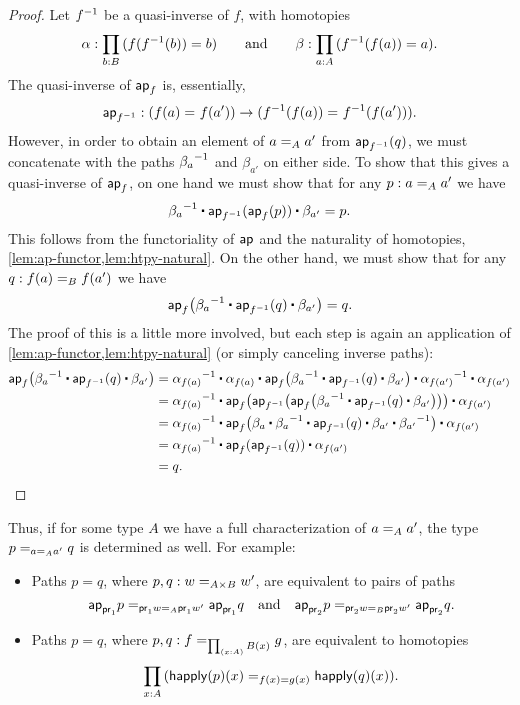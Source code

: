 \begin{proof}
  Let $\opp f$ be a quasi-inverse of $f$, with homotopies
  \begin{equation*}
    \alpha:\prd{b:B} (f(\opp f(b))=b)
    \qquad\text{and}\qquad
    \beta:\prd{a:A} (\opp f(f(a)) = a).
  \end{equation*}
  The quasi-inverse of $\apfunc{f}$ is, essentially,
  \[\apfunc{\opp f} : (\id{f(a)}{f(a')}) \to (\id{\opp f(f(a))}{\opp f(f(a'))}).\]
  However, in order to obtain an element of $\id[A]{a}{a'}$ from $\apfunc{\opp f}(q)$, we must concatenate with the paths $\opp{\beta_a}$ and $\beta_{a'}$ on either side.
  To show that this gives a quasi-inverse of $\apfunc{f}$, on one hand we must show that for any $p:\id[A]{a}{a'}$ we have
  \[ \opp{\beta_a} \ct \apfunc{\opp f}(\apfunc{f}(p)) \ct \beta_{a'} = p. \]
  This follows from the functoriality of $\apfunc{}$ and the naturality of homotopies, \autoref{lem:ap-functor,lem:htpy-natural}.
  On the other hand, we must show that for any $q:\id[B]{f(a)}{f(a')}$ we have
  \[ \apfunc{f}\big( \opp{\beta_a} \ct \apfunc{\opp f}(q) \ct \beta_{a'} \big) = q. \]
  The proof of this is a little more involved, but each step is again an application of \autoref{lem:ap-functor,lem:htpy-natural} (or simply canceling inverse paths):
  \begin{align*}
    \apfunc{f}\big( \narrowamp\opp{\beta_a} \ct \apfunc{\opp f}(q) \ct \beta_{a'} \big) \narrowbreak
    &= \opp{\alpha_{f(a)}} \ct {\alpha_{f(a)}} \ct
    \apfunc{f}\big( \opp{\beta_a} \ct \apfunc{\opp f}(q) \ct \beta_{a'} \big)
    \ct \opp{\alpha_{f(a')}} \ct {\alpha_{f(a')}}\\
    &= \opp{\alpha_{f(a)}} \ct
    \apfunc f \big(\apfunc{\opp f}\big(\apfunc{f}\big( \opp{\beta_a} \ct \apfunc{\opp f}(q) \ct \beta_{a'} \big)\big)\big)
    \ct {\alpha_{f(a')}}\\
    &= \opp{\alpha_{f(a)}} \ct
    \apfunc f \big(\beta_a \ct \opp{\beta_a} \ct \apfunc{\opp f}(q) \ct \beta_{a'} \ct \opp{\beta_{a'}} \big)
    \ct {\alpha_{f(a')}}\\
    &= \opp{\alpha_{f(a)}} \ct
    \apfunc f (\apfunc{\opp f}(q))
    \ct {\alpha_{f(a')}}\\
    &= q.\qedhere
  \end{align*}
\end{proof}

Thus, if for some type $A$ we have a full characterization of $\id[A]{a}{a'}$, the type $\id[{\id[A]{a}{a'}}]{p}{q}$ is determined as well.  
For example:
\begin{itemize}
\item Paths $p = q$, where $p,q : \id[A \times B]{w}{w'}$, are equivalent to pairs of paths
  \[\id[{\id[A]{\proj{1} w}{\proj{1} w'}}]{\projpath{1}{p}}{\projpath{1}{q}}
  \quad\text{and}\quad
  \id[{\id[B]{\proj{2} w}{\proj{2} w'}}]{\projpath{2}{p}}{\projpath{2}{q}}.
  \]
\item Paths $p = q$, where $p,q : \id[\prd{x:A} B(x)]{f}{g}$, are equivalent to homotopies
  \[\prd{x:A} (\id[f(x)=g(x)] {\happly(p)(x)}{\happly(q)(x)}).\]
\end{itemize}

